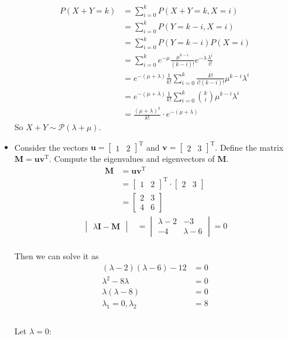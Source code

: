 \documentclass{article}
\begin{document}
\begin{itemize}
\begin{align*}
  P(X+ Y =k) &= \sum_{i = 0}^k P(X+ Y = k, X = i)\\
    &= \sum_{i=0}^k P(Y = k-i , X =i)\\
    &= \sum_{i=0}^k P(Y = k-i)P(X=i)\\
    &= \sum_{i=0}^k e^{-\mu}\frac{\mu^{k-i}}{(k-i)!}e^{-\lambda}\frac{\lambda^i}{i!}\\
   &= e^{-(\mu + \lambda)}\frac 1{k!}\sum_{i=0}^k \frac{k!}{i!(k-i)!}\mu^{k-i}\lambda^i\\
   &= e^{-(\mu + \lambda)}\frac 1{k!}\sum_{i=0}^k \binom ki\mu^{k-i}\lambda^i\\
   &= \frac{(\mu + \lambda)^k}{k!} \cdot e^{-(\mu + \lambda)}
\end{align*}
So $X + Y \sim \mathcal{P}(\lambda + \mu)$.
\item Consider the vectors $\bm{u} = \begin{bmatrix}
	1&2
\end{bmatrix}^\mathrm{T}$ and $\bm{v} = \begin{bmatrix}
	2&3
\end{bmatrix}^\mathrm{T}$. Define the matrix $\bm{M} = \bm{u}\bm{v}^\mathrm{T}$. Compute the eigenvalues and eigenvectors of $\bm{M}$.\\
\begin{align*}
	\bm{M} &= \bm{u}\bm{v}^\mathrm{T}\\
	&= \begin{bmatrix}1&2\end{bmatrix}^\mathrm{T}\cdot\begin{bmatrix}2&3\end{bmatrix}\\
&= \begin{bmatrix}2&3\\4&6\end{bmatrix}
\end{align*}
\begin{align*}
	\begin{vmatrix}\lambda \bm{I} - \bm{M}
		\end{vmatrix}
	&= 
	\begin{vmatrix}
		\lambda - 2 & -3\\
		-4 & \lambda - 6
	\end{vmatrix} = 0
\end{align*}\\
Then we can solve it as\\
\begin{align*}
	(\lambda - 2)(\lambda - 6) - 12 &= 0\\
	\lambda ^2 - 8 \lambda &= 0\\
	\lambda(\lambda - 8) &= 0\\
	\lambda_{1} = 0, \lambda_{2} &= 8\\
\end{align*}\\
Let $\lambda = 0$:\\


\end{itemize}
\end{document}
